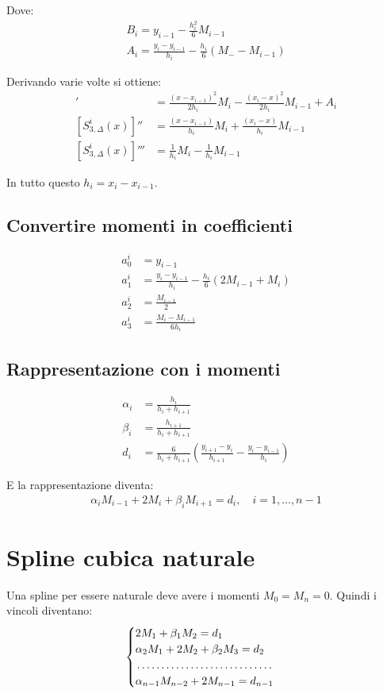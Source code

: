 Dove:
\begin{align}
  B_i = y_{i-1} - \frac{h_i^2}{6} M_{i-1} \\
  A_i = \frac{y_i - y_{i-1}}{h_i} - \frac{h_i}{6}(M_- - M_{i-1})
\end{align}


Derivando varie volte si ottiene:
\begin{align}
  [S_{3, \Delta}^i(x)]' &= \frac{(x - x_{i-1})^2}{2h_i} M_i - \frac{(x_i -x)^2}{2h_i} M_{i-1} + A_i \\
  [S_{3, \Delta}^i(x)]'' &= \frac{(x - x_{i-1})}{h_i} M_i + \frac{(x_i -x)}{h_i} M_{i-1} \\
  [S_{3, \Delta}^i(x)]''' &= \frac{1}{h_i} M_i - \frac{1}{h_i} M_{i-1}
\end{align}

In tutto questo $h_i = x_i - x_{i-1}$.

\subsection{Convertire momenti in coefficienti}
\begin{align}
  a_0^i &= y_{i-1} \\
  a_1^i &= \frac{y_i - y_{i-1}}{h_i} - \frac{h_i}{6}(2M_{i-1} + M_i) \\
  a_2^i &= \frac{M_{i-1}}{2} \\
  a_3^i &= \frac{M_i - M_{i-1}}{6h_i}
\end{align}


\subsection{Rappresentazione con i momenti}
\begin{align}
  \alpha_i &= \frac{h_i}{h_i + h_{i+1}} \\
  \beta_i &= \frac{h_{i+1}}{h_i + h_{i+1}} \\
  d_i &= \frac{6}{h_i + h_{i+1}} \left( \frac{y_{i+1} - y_i}{h_{i+1}} - \frac{y_i - y_{i-1}}{h_i} \right)
\end{align}

E la rappresentazione diventa:
\begin{align}
  \alpha_i M_{i-1} + 2 M_i + \beta_i M_{i+1} = d_i, \quad i = 1, \dots, n-1
\end{align}

\section{Spline cubica naturale}
Una spline per essere naturale deve avere i momenti $M_0 = M_n = 0$.
Quindi i vincoli diventano:
\begin{align}
  \begin{cases}
    2 M_1 + \beta_1 M_2 = d_1 \\
    \alpha_2 M_1 + 2 M_2 + \beta_2 M_3 = d_2 \\
    \dotfill \\
    \alpha_{n-1} M_{n-2} + 2 M_{n-1} = d_{n-1}
  \end{cases}
\end{align}


